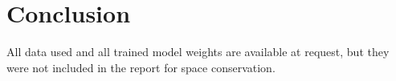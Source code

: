 \documentclass[10pt,twocolumn,letterpaper]{article}
\begin{document}
\section{Conclusion} \label{sec:conclusion}




  All data used and all trained model weights are available at request, but they were not included in the report for space conservation.


{\small



}
\end{document}
